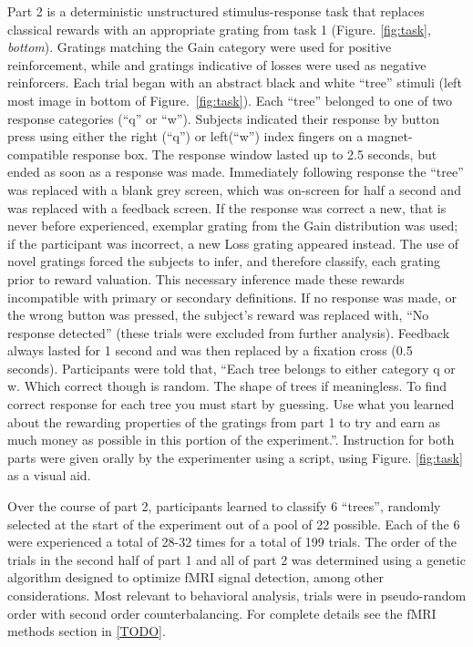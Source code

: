 \documentclass[doc,12pt]{apa}        %
\begin{document}
Part 2 is a deterministic unstructured stimulus-response task that replaces classical rewards with an appropriate grating from task 1  (Figure. \ref{fig:task}, \emph{bottom}).  Gratings matching the Gain category were used for positive reinforcement, while and gratings indicative of losses were used as negative reinforcers.   Each trial began with an abstract black and white ``tree'' stimuli (left most image in bottom of Figure.~\ref{fig:task}).  Each ``tree'' belonged to one of two response categories (``q'' or ``w'').  Subjects indicated their response by button press using either the right (``q'') or left(``w'') index fingers on a magnet-compatible response box.  The response window lasted up to 2.5 seconds, but ended as soon as a response was made.  Immediately following response the ``tree'' was replaced with a blank grey screen, which was on-screen for half a second and was replaced with a feedback screen.  If the response was correct a new, that is never before experienced, exemplar grating from the Gain distribution was used; if the participant was incorrect, a new Loss grating appeared instead.  The use of novel gratings forced the subjects to infer, and therefore classify, each grating prior to reward valuation.  This necessary inference made these rewards incompatible with primary or secondary definitions.  If no response was made, or the wrong button was pressed, the subject's reward was replaced with, ``No response detected'' (these trials were excluded from further analysis).  Feedback always lasted for 1 second and was then replaced by a fixation cross (0.5 seconds).  Participants were told that, ``Each tree belongs to either category q or w.  Which correct though is random.  The shape of trees if meaningless.  To find correct response for each tree you must start by guessing.  Use what you learned about the rewarding properties of the gratings from part 1 to try and earn as much money as possible in this portion of the experiment.''.  Instruction for both parts were given orally by the experimenter using a script, using Figure. \ref{fig:task} as a visual aid.

Over the course of part 2, participants learned to classify 6 ``trees'', randomly selected at the start of the experiment out of a pool of 22 possible.  Each of the 6 were experienced a total of 28-32 times for a total of 199 trials. The order of the trials in the second half of part 1 and all of part 2 was determined using a genetic algorithm designed to optimize fMRI signal detection, among other considerations.  Most relevant to behavioral analysis, trials were in pseudo-random order with second order counterbalancing.  For complete details see the fMRI methods section in \ref{TODO}.
\end{document}
